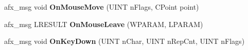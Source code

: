 \begin{DoxyCompactItemize}
\item 
\hypertarget{class_c_vis_a9ed44f1fb6c285ab90ff23dafe6367c0}{afx\-\_\-msg void {\bfseries On\-Mouse\-Move} (U\-I\-N\-T n\-Flags, C\-Point point)}\label{class_c_vis_a9ed44f1fb6c285ab90ff23dafe6367c0}

\item 
\hypertarget{class_c_vis_af73f2c7d4e8f406eb72c56be889c49d9}{afx\-\_\-msg L\-R\-E\-S\-U\-L\-T {\bfseries On\-Mouse\-Leave} (W\-P\-A\-R\-A\-M, L\-P\-A\-R\-A\-M)}\label{class_c_vis_af73f2c7d4e8f406eb72c56be889c49d9}

\item 
\hypertarget{class_c_vis_aecc667d11a38a2f86b5c294c464257b1}{afx\-\_\-msg void {\bfseries On\-Key\-Down} (U\-I\-N\-T n\-Char, U\-I\-N\-T n\-Rep\-Cnt, U\-I\-N\-T n\-Flags)}\label{class_c_vis_aecc667d11a38a2f86b5c294c464257b1}

\end{DoxyCompactItemize}
